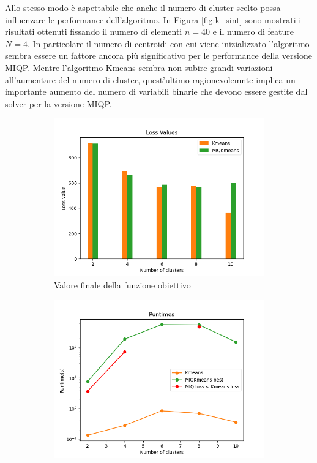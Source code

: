 \documentclass{article}
\begin{document}
    Allo stesso modo è aspettabile che anche il numero di cluster scelto possa influenzare le performance dell'algoritmo. In Figura \ref{fig:k_sint} sono mostrati i risultati ottenuti fissando il numero di elementi $n=40$ e il numero di feature $N=4$. In particolare il numero di centroidi con cui viene inizializzato l'algoritmo sembra essere un fattore ancora più significativo per le performance della versione MIQP.
    Mentre l'algoritmo Kmeans sembra non subire grandi variazioni all'aumentare del numero di cluster, quest'ultimo ragionevolemnte implica un importante aumento del numero di variabili binarie che devono essere gestite dal solver per la versione MIQP.\\
    \begin{figure}[H]
     \centering
     \begin{subfigure}[t]{0.49\linewidth}
         \centering
         \includegraphics[width=\linewidth]{../results/log_plots/loss_centers_sint}
         \caption{Valore finale della funzione obiettivo}
     \end{subfigure}
     \hfill
     \begin{subfigure}[t]{0.49\linewidth}
         \centering
         \includegraphics[width=\linewidth]{../results/log_plots/runtime_centers_sint_log}

\end{subfigure}
\end{figure}
\end{document}
